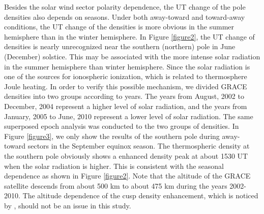 \documentclass[draft, grl]{/home/guod/Documents/template/agu_template/AGUTeX}
\begin{document}
\begin{article}
    Besides the solar wind sector polarity dependence, the UT change of the pole
    densities also depends on seasons. Under both away-toward and toward-away
    conditions, the UT change of the densities is more obvious in the summer
    hemisphere than in the winter hemisphere. In Figure \ref{figure2}, the UT
    change of densities is nearly unrecognized near the southern (northern) pole
    in June (December) solstice. This may be associated with the more intense 
    solar radiation in the summer hemisphere than winter hemisphere. Since the
    solar radiation is one of the sources for ionospheric ionization, which is
    related to thermosphere Joule heating. In order to verify this possible 
    mechanism, we divided GRACE densities into two groups according to years.
    The years from August, 2002 to December, 2004 represent a higher level of
    solar radiation, and the years from January, 2005 to June, 2010 represent 
    a lower level of solar radiation. The same superposed epoch analysis was
    conducted to the two groups of densities. In Figure \ref{figure3}, we only 
    show the results of the southern pole during away-toward sectors in the
    September equinox season. The thermospheric density at the southern pole 
    obviously shows a enhanced density peak at about 1530 UT when the solar
    radiation is higher. This is consistent with the seasonal dependence as 
    shown in Figure \ref{figure2}. Note that the altitude of the GRACE satellite
    descends from about 500 km to about 475 km during the years 2002-2010. The
    altitude dependence of the cusp density enhancement, which is noticed by 
    \citet{Clemmons2008}, should not be an issue in this study.


\end{article}
\end{document}
